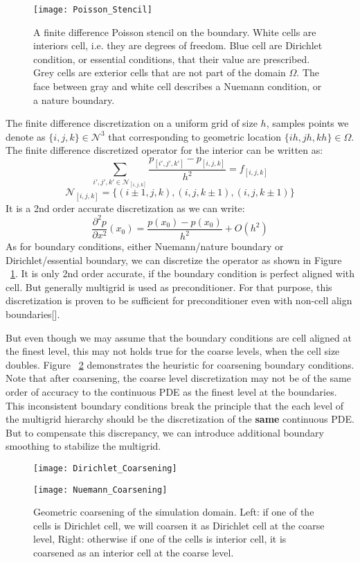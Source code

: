 \begin{figure}[t]
\texttt{[image: Poisson\_Stencil]}
\centering
\caption{A finite difference Poisson stencil on the boundary. White cells are interiors cell, i.e. they are degrees of freedom. Blue cell are Dirichlet condition, or essential conditions, that their value are prescribed. Grey cells are exterior cells that are not part of the domain $\Omega$. The face between gray and white cell describes a Nuemann condition, or a nature boundary.}
\label{fig:PoissonBoundary}
\end{figure}

The finite difference discretization on a uniform grid of size $h$, samples points we denote as $\{i,j,k\} \in \mathcal{N}^3$ that corresponding to geometric location $\{ih,jh,kh\} \in \Omega$. The finite difference discretized operator for the interior can be written as:
\begin{equation}
\sum_{i',j',k'\in \mathcal{N}_{[i,j,k]}}\frac{p_{[i',j',k']}-p_{[i,j,k]}}{h^2} = f_{[i,j,k]}
\end{equation}
$$
\mathcal{N}_{[i,j,k]} = \{(i\pm1,j,k),(i,j,k\pm1),(i,j,k\pm1)\}
$$
It is a 2nd order accurate discretization as we can write:
$$
\frac{\partial^2 p}{\partial x^2}(x_0) = \frac{p(x_0)-p(x_0)}{h^2} + O(h^2)
$$
As for boundary conditions, either Nuemann/nature boundary or Dirichlet/essential boundary, we can discretize the operator as shown in Figure ~\ref{fig:PoissonBoundary}. It is only 2nd order accurate, if the boundary condition is perfect aligned with cell. But generally multigrid is used as preconditioner. For that purpose, this discretization is proven to be sufficient for preconditioner even with non-cell align boundaries[\cite{aanjaneya2017power}]. 

But even though we may assume that the boundary conditions are cell aligned at the finest level, this may not holds true for the coarse levels, when the cell size doubles. Figure ~\ref{fig:GeometricCoarsening} demonstrates the heuristic for coarsening boundary conditions. Note that after coarsening, the coarse level discretization may not be of the same order of accuracy to the continuous PDE as the finest level at the boundaries. This inconsistent boundary conditions break the principle that the each level of the multigrid hierarchy should be the discretization of the \textbf{same} continuous PDE. But to compensate this discrepancy, we can introduce additional boundary smoothing to stabilize the multigrid.
\begin{figure}[t]
\centering
\begin{minipage}{.5\textwidth}
  \centering
  \texttt{[image: Dirichlet\_Coarsening]}
\end{minipage}%
\begin{minipage}{.5\textwidth}
  \centering
  \texttt{[image: Nuemann\_Coarsening]}
\end{minipage}
  \caption{Geometric coarsening of the simulation domain. Left: if one of the cells is Dirichlet cell, we will coarsen it as Dirichlet cell at the coarse level, Right: otherwise if one of the cells is interior cell, it is coarsened as an interior cell at the coarse level.}
  \label{fig:GeometricCoarsening}
\end{figure}
